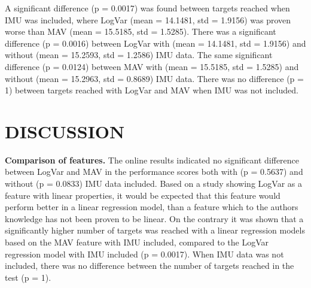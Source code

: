 \begin{multicols}{2}
	
		\begin{center}
		\end{center}
	
	A significant difference (p = 0.0017) was found between targets reached when IMU was included, where LogVar (mean = 14.1481, std = 1.9156) was proven worse than MAV (mean = 15.5185, std = 1.5285). There was a significant difference (p = 0.0016) between LogVar with (mean = 14.1481, std = 1.9156) and without (mean = 15.2593, std = 1.2586) IMU data. The same significant difference (p = 0.0124) between MAV with (mean = 15.5185, std = 1.5285) and without (mean = 15.2963, std = 0.8689) IMU data. There was no difference (p = 1) between targets reached with LogVar and MAV when IMU was not included.
	
\section*{DISCUSSION}%
	
%		
\textbf{Comparison of features.}
The online results indicated no significant difference between LogVar and MAV in the performance scores both with (p = 0.5637) and without (p = 0.0833) IMU data included. Based on a study \cite{hahne2014} showing LogVar as a feature with linear properties, it would be expected that this feature would perform better in a linear regression model, than a feature which to the authors knowledge has not been proven to be linear. On the contrary it was shown that a significantly higher number of targets was reached with a linear regression models based on the MAV feature with IMU included, compared to the LogVar regression model with IMU included (p = 0.0017). When IMU data was not included, there was no difference between the number of targets reached in the test (p = 1).


\end{multicols}

